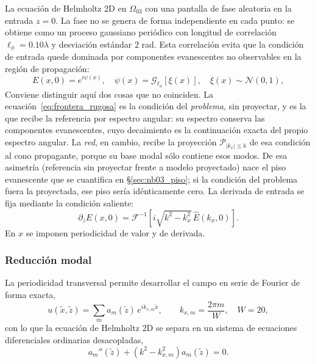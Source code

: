 La ecuación de Helmholtz 2D en $\Omega_{03}$ con una pantalla de fase
aleatoria en la entrada $z=0$. La fase no se genera de forma independiente en
cada punto: se obtiene como un proceso gaussiano periódico con longitud de
correlación $\ell_\phi=0.10\lambda$ y desviación estándar $2$ rad. Esta
correlación evita que la condición de entrada quede dominada por componentes
evanescentes no observables en la región de propagación:
%
\begin{equation}
    E(x, 0) = e^{i\psi(x)}, \quad
    \psi(x)=\mathcal{G}_{\ell_\phi}[\xi(x)],
    \quad \xi(x)\sim\mathcal{N}(0,1),
    \label{eq:frontera_rugosa}
\end{equation}
%
Conviene distinguir aquí dos cosas que no coinciden. La
ecuación~\eqref{eq:frontera_rugosa} es la condición del \emph{problema}, sin
proyectar, y es la que recibe la referencia por espectro angular: su espectro
conserva las componentes evanescentes, cuyo decaimiento es la continuación
exacta del propio espectro angular. La \emph{red}, en cambio, recibe la
proyección $\mathcal{P}_{|k_x|\leq k}$ de esa condición al cono propagante,
porque su base modal sólo contiene esos modos. De esa asimetría (referencia sin
proyectar frente a modelo proyectado) nace el piso evanescente que se cuantifica
en §\ref{sec:nb03_piso}; si la condición del problema fuera la proyectada, ese
piso sería idénticamente cero. La derivada de entrada se fija mediante la condición saliente:
%
\begin{equation}
    \partial_z E(x,0)=
    \mathcal{F}^{-1}\!\left[
    i\sqrt{k^2-k_x^2}\,
    \widehat{E}(k_x,0)\right].
    \label{eq:derivada_saliente}
\end{equation}
%
En $x$ se imponen periodicidad de valor y de derivada.

\subsubsection*{Reducción modal}

La periodicidad transversal permite desarrollar el campo en serie de Fourier de
forma exacta,
%
\begin{equation}
    u(\tilde x,\tilde z)=\sum_{m} a_m(\tilde z)\,e^{i k_{x,m}\tilde x},
    \qquad k_{x,m}=\frac{2\pi m}{W},\quad W=20 ,
    \label{eq:desarrollo_modal}
\end{equation}
%
con lo que la ecuación de Helmholtz 2D se separa en un sistema de ecuaciones
diferenciales ordinarias desacopladas,
%
\begin{equation}
    a_m''(\tilde z) + \left(k^2-k_{x,m}^2\right) a_m(\tilde z) = 0 .
    \label{eq:edo_modal_cap3}
\end{equation}
%
